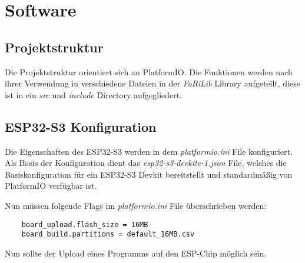 \chapter{Software}

    \section{Projektstruktur}
    Die Projektstruktur orientiert sich an PlatformIO. Die Funktionen 
    werden nach ihrer Verwendung in verschiedene Dateien in der \textit{FaRiLib} 
    Library aufgeteilt, diese ist in ein \textit{src} und \textit{include} 
    Directory aufgegliedert.

    \section{ESP32-S3 Konfiguration}
    Die Eigenschaften des ESP32-S3 werden in dem \textit{platformio.ini}
    File konfiguriert. Als Basis der Konfiguration dient
    das \textit{esp32-s3-devkitc-1.json} File, welches die
    Basiskonfiguration für ein ESP32-S3 Devkit bereitstellt
    und standardmäßig von PlatformIO verfügbar ist. \par
    
    Nun müssen folgende Flags im \textit{platformio.ini} File
    überschrieben werden:

    \begin{lstlisting}
    board_upload.flash_size = 16MB
    board_build.partitions = default_16MB.csv
    \end{lstlisting}

    Nun sollte der Upload eines Programms auf den 
    ESP-Chip möglich sein.

    
    



